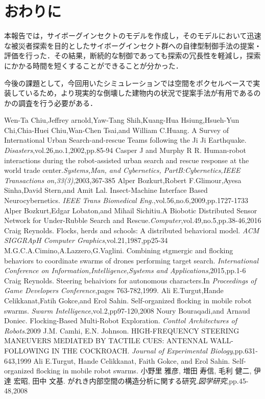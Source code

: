 \documentclass[a4paper,11pt]{jarticle}
\begin{document}
	\section{おわりに}
	\label{sec:last}
	本報告では，サイボーグインセクトのモデルを作成し，そのモデルにおいて迅速な被災者探索を目的としたサイボーグインセクト群への自律型制御手法の提案・評価を行った．その結果，断続的な制御であっても探索の冗長性を軽減し，探索にかかる時間を短くすることができることが分かった．
	
	今後の課題として，今回用いたシミュレーションでは空間をボクセルベースで実装しているため，より現実的な倒壊した建物内の状況で提案手法が有用であるのかの調査を行う必要がある．

%	
%	
	\begin{thebibliography}{99}
		 Wen-Ta Chiu,Jeffrey arnold,Yaw-Tang Shih,Kuang-Hua Hsiung,Hsueh-Yun Chi,Chia-Huei Chiu,Wan-Chen Tsai,and William C.Huang. A Survey of International Urban Search-and-rescue Teams following the Ji Ji Earthquake. \textit{Disasters},vol.26,no.1,2002,pp.85-94
		Casper J and Murphy R R. Human-robot interactions during the robot-assisted urban search and rescue response at the world trade center.\textit{Systems,Man, and Cybernetics, PartB:Cybernetics,IEEE Transactions on,33(3)},2003,367-385
		Alper Bozkurt,Robert F.Glimour,Ayesa Sinha,David Stern,and Amit Lal. Insect-Machine Interface Based Neurocybernetics. \textit{IEEE Trans Biomedical Eng.},vol.56,no.6,2009,pp.1727-1733
		Alper Bozkurt,Edgar Lobaton,and Mihail Sichitiu.A Biobotic Distributed Sensor Network for Under-Rubble Search and Rescue.\textit{Computer},vol.49,no.5,pp.38-46,2016
		Craig Reynolds. Flocks, herds and schools: A distributed behavioral model. \textit{ACM SIGGRApH Computer Graphics},vol.21,1987,pp25-34
		M.G.C.A.Cimino,A.Lazzero,G.Vaglini. Combining stgmergic and flocking behaviors to coordinate swarms of drones performing target search. \textit{International Conference on Information,Intelligence,Systems and Applications},2015,pp.1-6
		Craig Reynolds. Steering behaiviors for autonomous characters.In \textit{Proceedings of Game Developers Conference},pages 763-782,1999.
		Ali E.Turgut,Hande Celikkanat,Fatih Gokce,and Erol Sahin. Self-organized flocking in mobile robot swarms. \textit{Swarm Intelligence},vol.2,pp97-120,2008
		Noury Bouraqadi,and Arnaud Doniec. Flocking-Based Multi-Robot Exploration. \textit{Conttol Architectures of Robots}.2009
		J.M. Camhi, E.N. Johnson. HIGH-FREQUENCY STEERING MANEUVERS MEDIATED BY TACTILE CUES: ANTENNAL WALL-FOLLOWING IN THE COCKROACH. \textit{Journal of Experimental Biology},pp.631-643,1999
		Ali E.Turgut, Hande Celikkanat, Faith Gokce, and Erol Sahin. Self-organized flocking in mobile robot swarms.
		小野里 雅彦, 増田 寿信, 毛利 健二, 伊達 宏昭, 田中 文基. がれき内部空間の構造分析に関する研究.\textit{図学研究},pp.45-48,2008
		
	\end{thebibliography}
\end{document}
